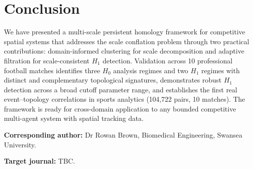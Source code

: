 \section{Conclusion}
\label{sec:conclusion}

We have presented a multi-scale persistent homology framework for competitive spatial systems that addresses the scale conflation problem through two practical contributions: domain-informed clustering for scale decomposition and adaptive filtration for scale-consistent \(H_1\) detection. Validation across 10 professional football matches identifies three \(H_0\) analysis regimes and two \(H_1\) regimes with distinct and complementary topological signatures, demonstrates robust \(H_1\) detection across a broad cutoff parameter range, and establishes the first real event--topology correlations in sports analytics (104,722 pairs, 10 matches). The framework is ready for cross-domain application to any bounded competitive multi-agent system with spatial tracking data.

\bigskip
\noindent\textbf{Corresponding author:} Dr Rowan Brown, Biomedical Engineering, Swansea University.

\noindent\textbf{Target journal:} TBC.
